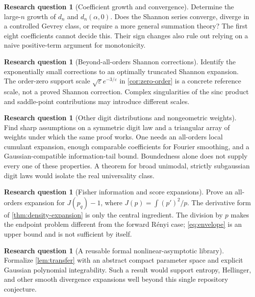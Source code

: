 \documentclass[11pt,a4paper]{article}
\numberwithin{equation}{section}
\theoremstyle{definition}
\newtheorem{problem}[theorem]{Research question}
\theoremstyle{remark}
\newcommand{\eps}{\varepsilon}
\begin{document}
\begin{problem}[Coefficient growth and convergence]
Determine the large-$n$ growth of $d_n$ and $d_n(\alpha,0)$. Does the
Shannon series converge, diverge in a controlled Gevrey class, or require a
more general summation theory? The first eight coefficients cannot decide
this. Their sign changes also rule out relying on a naive positive-term
argument for monotonicity.
\end{problem}

\begin{problem}[Beyond-all-orders Shannon corrections]
Identify the exponentially small corrections to an optimally truncated
Shannon expansion. The order-zero support scale
$\sqrt\eps e^{-3/\eps}$ in \cref{cor:zero-order} is a concrete reference
scale, not a proved Shannon correction. Complex singularities of the sinc
product and saddle-point contributions may introduce different scales.
\end{problem}

\begin{problem}[Other digit distributions and nongeometric weights]
Find sharp assumptions on a symmetric digit law and a triangular array of
weights under which the same proof works. One needs an all-orders local
cumulant expansion, enough comparable coefficients for Fourier smoothing,
and a Gaussian-compatible information-tail bound. Boundedness alone does not
supply every one of these properties. A theorem for broad unimodal,
strictly subgaussian digit laws would isolate the real universality class.
\end{problem}

\begin{problem}[Fisher information and score expansions]
Prove an all-orders expansion for $J(p_q)-1$, where
$J(p)=\int(p')^2/p$. The derivative form of
\cref{thm:density-expansion} is only the central ingredient. The division by
$p$ makes the endpoint problem different from the forward R\'enyi case;
\eqref{eq:envelope} is an upper bound and is not sufficient by itself.
\end{problem}

\begin{problem}[A reusable formal nonlinear-asymptotic library]
Formalize \cref{lem:transfer} with an abstract compact parameter space and
explicit Gaussian polynomial integrability. Such a result would support
entropy, Hellinger, and other smooth divergence expansions well beyond this
single repository conjecture.
\end{problem}
\end{document}
